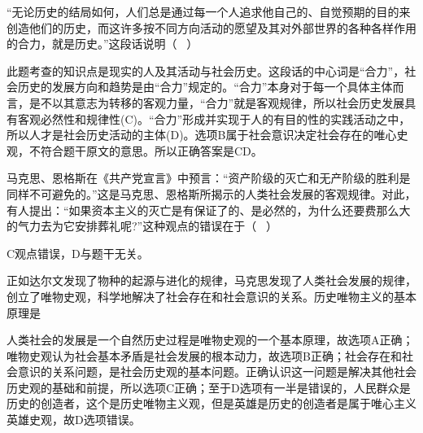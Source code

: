\question ``无论历史的结局如何，人们总是通过每一个人追求他自己的、自觉预期的目的来创造他们的历史，而这许多按不同方向活动的愿望及其对外部世界的各种各样作用的合力，就是历史。''这段话说明（
~）
\par{}
\begin{solution}此题考查的知识点是现实的人及其活动与社会历史。这段话的中心词是``合力''，社会历史的发展方向和趋势是由``合力''规定的。``合力''本身对于每一个具体主体而言，是不以其意志为转移的客观力量，``合力''就是客观规律，所以社会历史发展具有客观必然性和规律性(C)。``合力''形成并实现于人的有目的性的实践活动之中，所以人才是社会历史活动的主体(D)。选项B属于社会意识决定社会存在的唯心史观，不符合题干原文的意思。所以正确答案是CD。
\end{solution}
\question 马克思、恩格斯在《共产党宣言》中预言：``资产阶级的灭亡和无产阶级的胜利是同样不可避免的。''这是马克思、恩格斯所揭示的人类社会发展的客观规律。对此，有人提出：``如果资本主义的灭亡是有保证了的、是必然的，为什么还要费那么大的气力去为它安排葬礼呢?''这种观点的错误在于（
~）
\par{}
\begin{solution}C观点错误，D与题干无关。
\end{solution}
\question 正如达尔文发现了物种的起源与进化的规律，马克思发现了人类社会发展的规律，创立了唯物史观，科学地解决了社会存在和社会意识的关系。历史唯物主义的基本原理是
\par{}
\begin{solution}人类社会的发展是一个自然历史过程是唯物史观的一个基本原理，故选项A正确；唯物史观认为社会基本矛盾是社会发展的根本动力，故选项B正确；社会存在和社会意识的关系问题，是社会历史观的基本问题。正确认识这一问题是解决其他社会历史观的基础和前提，所以选项C正确；至于D选项有一半是错误的，人民群众是历史的创造者，这个是历史唯物主义观，但是英雄是历史的创造者是属于唯心主义英雄史观，故D选项错误。
\end{solution}
